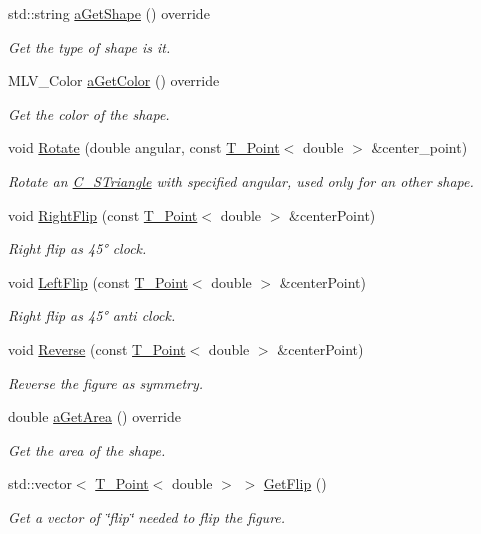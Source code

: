 \begin{DoxyCompactItemize}
std\+::string \hyperlink{classC__STriangle_a40c1434870b99112c4457819c9295483}{a\+Get\+Shape} () override
\begin{DoxyCompactList}\small\item\em Get the type of shape is it. \end{DoxyCompactList}\item 
M\+L\+V\+\_\+\+Color \hyperlink{classC__STriangle_a1a0c315653ece65118705648d09336dd}{a\+Get\+Color} () override
\begin{DoxyCompactList}\small\item\em Get the color of the shape. \end{DoxyCompactList}\item 
void \hyperlink{classC__STriangle_afe6a1fcb5bf97792dd38e698bb6ad0cd}{Rotate} (double angular, const \hyperlink{classT__Point}{T\+\_\+\+Point}$<$ double $>$ \&center\+\_\+point)
\begin{DoxyCompactList}\small\item\em Rotate an \hyperlink{classC__STriangle}{C\+\_\+\+S\+Triangle} with specified angular, used only for an other shape. \end{DoxyCompactList}\item 
void \hyperlink{classC__STriangle_ad84c7c6c2a4ca6d2fd3a681fd6dfcf63}{Right\+Flip} (const \hyperlink{classT__Point}{T\+\_\+\+Point}$<$ double $>$ \&center\+Point)
\begin{DoxyCompactList}\small\item\em Right flip as 45° clock. \end{DoxyCompactList}\item 
void \hyperlink{classC__STriangle_aec7540d5750509269894dc4c906fc20f}{Left\+Flip} (const \hyperlink{classT__Point}{T\+\_\+\+Point}$<$ double $>$ \&center\+Point)
\begin{DoxyCompactList}\small\item\em Right flip as 45° anti clock. \end{DoxyCompactList}\item 
void \hyperlink{classC__STriangle_a3fafeed75d888024e95a494b8901e8fe}{Reverse} (const \hyperlink{classT__Point}{T\+\_\+\+Point}$<$ double $>$ \&center\+Point)
\begin{DoxyCompactList}\small\item\em Reverse the figure as symmetry. \end{DoxyCompactList}\item 
double \hyperlink{classC__STriangle_aaff25f3c7f7640c3e7c735a77800e96e}{a\+Get\+Area} () override
\begin{DoxyCompactList}\small\item\em Get the area of the shape. \end{DoxyCompactList}\item 
std\+::vector$<$ \hyperlink{classT__Point}{T\+\_\+\+Point}$<$ double $>$ $>$ \hyperlink{classC__STriangle_afdeec8c3851ebc3d7fe21a77e8768bfa}{Get\+Flip} ()
\begin{DoxyCompactList}\small\item\em Get a vector of \char`\"{}flip\char`\"{} needed to flip the figure. \end{DoxyCompactList}\end{DoxyCompactItemize}
